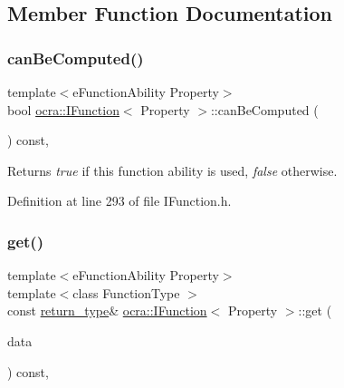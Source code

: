 \subsection{Member Function Documentation}
\hypertarget{classocra_1_1IFunction_a18703c0b7573f9a1629236c9e10150d9}{}\label{classocra_1_1IFunction_a18703c0b7573f9a1629236c9e10150d9} 
\subsubsection{\texorpdfstring{can\+Be\+Computed()}{canBeComputed()}}
{\footnotesize\ttfamily template$<$e\+Function\+Ability Property$>$ \\
bool \hyperlink{classocra_1_1IFunction}{ocra\+::\+I\+Function}$<$ Property $>$\+::can\+Be\+Computed (\begin{DoxyParamCaption}{ }\end{DoxyParamCaption}) const\hspace{0.3cm}{\ttfamily [inline]}, {\ttfamily [protected]}}

\begin{DoxyReturn}{Returns}
{\itshape true} if this function ability is used, {\itshape false} otherwise. 
\end{DoxyReturn}


Definition at line 293 of file I\+Function.\+h.

\hypertarget{classocra_1_1IFunction_a0f7422af163eedba66749b79b9a70787}{}\label{classocra_1_1IFunction_a0f7422af163eedba66749b79b9a70787} 
\subsubsection{\texorpdfstring{get()}{get()}\hspace{0.1cm}{\footnotesize\ttfamily [1/2]}}
{\footnotesize\ttfamily template$<$e\+Function\+Ability Property$>$ \\
template$<$class Function\+Type $>$ \\
const \hyperlink{classocra_1_1IFunction_a04d351c2f938d01046328b54fb7e6525}{return\+\_\+type}\& \hyperlink{classocra_1_1IFunction}{ocra\+::\+I\+Function}$<$ Property $>$\+::get (\begin{DoxyParamCaption}\item[{Function\+Type \&}]{data }\end{DoxyParamCaption}) const\hspace{0.3cm}{\ttfamily [inline]}, {\ttfamily [protected]}}

